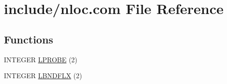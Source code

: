 \hypertarget{nloc_8com}{\section{include/nloc.com File Reference}
\label{nloc_8com}
}
\subsection*{Functions}
\begin{DoxyCompactItemize}
\item 
I\-N\-T\-E\-G\-E\-R \hyperlink{nloc_8com_ade8755dc46f6ab90e43b675468447a6a}{L\-P\-R\-O\-B\-E} (2)
\item 
I\-N\-T\-E\-G\-E\-R \hyperlink{nloc_8com_a7878a6929dd0bb737d94892ae3d464be}{L\-B\-N\-D\-F\-L\-X} (2)
\end{DoxyCompactItemize}
